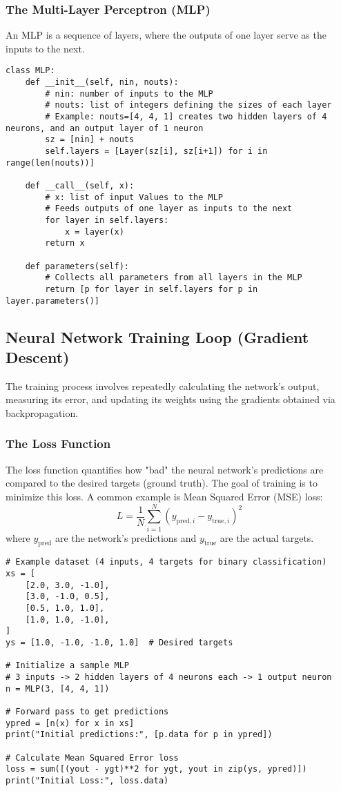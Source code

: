 \subsubsection{The Multi-Layer Perceptron (MLP)} 
An MLP is a sequence of layers, where the outputs of one layer serve as the inputs to the next.

\begin{lstlisting}[caption={MLP Class Implementation}] 
class MLP: 
    def __init__(self, nin, nouts): 
        # nin: number of inputs to the MLP 
        # nouts: list of integers defining the sizes of each layer 
        # Example: nouts=[4, 4, 1] creates two hidden layers of 4 neurons, and an output layer of 1 neuron 
        sz = [nin] + nouts 
        self.layers = [Layer(sz[i], sz[i+1]) for i in range(len(nouts))]

    def __call__(self, x):
        # x: list of input Values to the MLP
        # Feeds outputs of one layer as inputs to the next
        for layer in self.layers:
            x = layer(x)
        return x

    def parameters(self):
        # Collects all parameters from all layers in the MLP
        return [p for layer in self.layers for p in layer.parameters()]
\end{lstlisting}

\subsection{Neural Network Training Loop (Gradient Descent)}
The training process involves repeatedly calculating the network's output, measuring its error, and updating its weights using the gradients obtained via backpropagation.

\subsubsection{The Loss Function} 
The loss function quantifies how "bad" the neural network's predictions are compared to the desired targets (ground truth). The goal of training is to minimize this loss. A common example is Mean Squared Error (MSE) loss: 
$$ L = \frac{1}{N} \sum_{i=1}^{N} (y_{\text{pred},i} - y_{\text{true},i})^2 $$ 
where $y_{\text{pred}}$ are the network's predictions and $y_{\text{true}}$ are the actual targets.

\begin{lstlisting}[caption={Example Data and Loss Calculation}]
# Example dataset (4 inputs, 4 targets for binary classification)
xs = [ 
    [2.0, 3.0, -1.0], 
    [3.0, -1.0, 0.5], 
    [0.5, 1.0, 1.0], 
    [1.0, 1.0, -1.0], 
] 
ys = [1.0, -1.0, -1.0, 1.0]  # Desired targets

# Initialize a sample MLP
# 3 inputs -> 2 hidden layers of 4 neurons each -> 1 output neuron
n = MLP(3, [4, 4, 1])

# Forward pass to get predictions
ypred = [n(x) for x in xs] 
print("Initial predictions:", [p.data for p in ypred])

# Calculate Mean Squared Error loss
loss = sum([(yout - ygt)**2 for ygt, yout in zip(ys, ypred)]) 
print("Initial Loss:", loss.data) 
\end{lstlisting}

